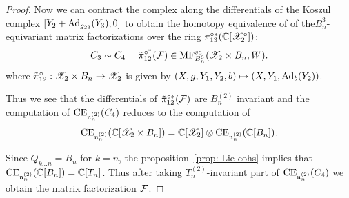 \begin{proof}
 Now we can contract the complex along the differentials of the Koszul complex $[Y_2+{\rm Ad}_{g_{23}}(Y_3),0]$ to obtain the homotopy equivalence of
 of
 the$B_n^3$-equivariant  matrix factorizations over the ring $\pi_{13}^{\circ*}(\mathbb{C}[\mathscr{X}_2^{\circ}])$:
 \begin{equation*}
  C_3\sim C_4=\tilde{\pi}_{12}^{\circ^*}(\mathcal{F})\in \mathrm{MF}^{sc}_{B_n^3}(\mathscr{X}_2\times B_n,W).
  \end{equation*}
 where $\tilde{\pi}_{12}^{\circ}:\mathscr{X}_2\times B_n\to \mathscr{X}_2$ is given by $(X,g,Y_1,Y_2,b)\mapsto (X,Y_1,{\rm Ad}_{b}(Y_2))$.

 Thus we see that the differentials of $\tilde{\pi}_{12}^{\circ*}(\mathcal{F})$ are $B_n^{(2)}$ invariant and the computation of
 $\mathrm{CE}_{\mathfrak{n}_n^{(2)}}(C_4)$ reduces to the computation of
 $$\mathrm{CE}_{\mathfrak{n}_n^{(2)}}(\mathbb{C}[\mathscr{X}_2\times B_n])=\mathbb{C}[\mathscr{X}_2]\otimes \mathrm{CE}_{\mathfrak{n}_n^{(2)}}(\mathbb{C}[B_n]).$$
 
Since \(Q_{k\dots n}=B_n\) for \(k=n\), the proposition~\ref{prop: Lie cohs} implies
 that $\mathrm{CE}_{\mathfrak{n}_n^{(2)}}(\mathbb{C}[B_n])=\mathbb{C}[T_n]$. Thus after taking $T_n^{(2)}$-invariant part of
 $\mathrm{CE}_{\mathfrak{n}_n^{(2)}}(C_4)$ we obtain the matrix factorization $\mathcal{F}$.
\end{proof}



